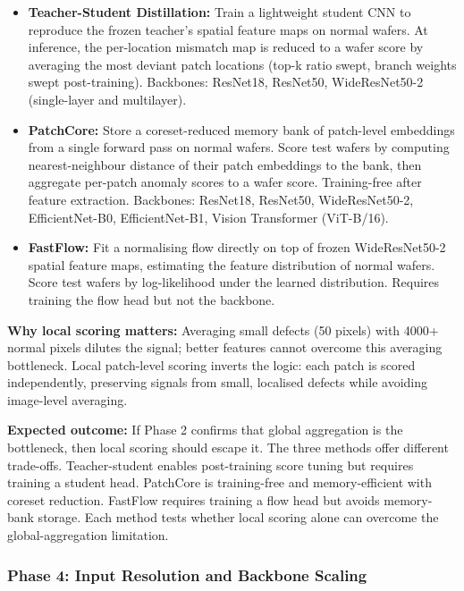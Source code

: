 \documentclass[11pt]{article}
\begin{document}
\begin{itemize}[leftmargin=1.5em]
  \item \textbf{Teacher-Student Distillation:} Train a lightweight student CNN to reproduce the frozen teacher's
    spatial feature maps on normal wafers. At inference, the per-location mismatch map is reduced to a wafer score
    by averaging the most deviant patch locations (top-k ratio swept, branch weights swept post-training).
    Backbones: ResNet18, ResNet50, WideResNet50-2 (single-layer and multilayer).

  \item \textbf{PatchCore:} Store a coreset-reduced memory bank of patch-level embeddings from a single forward
    pass on normal wafers. Score test wafers by computing nearest-neighbour distance of their patch embeddings
    to the bank, then aggregate per-patch anomaly scores to a wafer score. Training-free after feature extraction.
    Backbones: ResNet18, ResNet50, WideResNet50-2, EfficientNet-B0, EfficientNet-B1, Vision Transformer (ViT-B/16).

  \item \textbf{FastFlow:} Fit a normalising flow directly on top of frozen WideResNet50-2 spatial feature maps,
    estimating the feature distribution of normal wafers. Score test wafers by log-likelihood under the learned
    distribution. Requires training the flow head but not the backbone.

\end{itemize}

\textbf{Why local scoring matters:} Averaging small defects (50 pixels) with 4000+ normal pixels dilutes the signal;
better features cannot overcome this averaging bottleneck. Local patch-level scoring inverts the logic: each patch
is scored independently, preserving signals from small, localised defects while avoiding image-level averaging.

\textbf{Expected outcome:} If Phase 2 confirms that global aggregation is the bottleneck, then local scoring should
escape it. The three methods offer different trade-offs. Teacher-student enables post-training score tuning but
requires training a student head. PatchCore is training-free and memory-efficient with coreset reduction. FastFlow
requires training a flow head but avoids memory-bank storage. Each method tests whether local scoring alone can
overcome the global-aggregation limitation.


\subsubsection{Phase 4: Input Resolution and Backbone Scaling}
\end{document}
